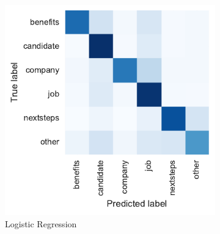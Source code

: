\begin{figure}[h]
    \centering
    \begin{subfigure}[b]{0.32\textwidth}
        \includegraphics[width=\textwidth]{img/exp-vector-space/bom-conf-matrix-logreg-normalized.pdf}
        \caption{Logistic Regression}
\label{fig:bom-conf-matrix-logreg-normalized}
    \end{subfigure}
    \begin{subfigure}[b]{0.32\textwidth}

\end{subfigure}
\end{figure}

